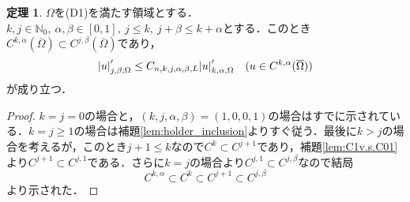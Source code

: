 \documentclass[a4paper]{ltjsarticle}
\newcommand{\Nset}{\mathbb{N}}
\newcommand{\Om}{\Omega}
\newcommand{\Ombar}{\overline{\Omega}}
\newcommand{\1}{\mathbbm{1}}
\numberwithin{equation}{section}
\theoremstyle{definition}
\newtheorem{thm}{定理}[section]
\begin{document}
\begin{thm}
    $\Om$を(D1)を満たす領域とする．$k,j\in\Nset_0,\ \alpha,\beta\in[0,1],\ j\leq k,\ j+\beta\leq k+\alpha$とする．このとき$C^{k,\alpha}(\Ombar)\subset C^{j,\beta}(\Ombar)$であり，
    \begin{equation}
        \abs{u}_{j,\beta;\Om}'\leq C_{n,k,j,\alpha,\beta,L}\abs{u}_{k,\alpha,\Om}'\quad (u\in C^{k,\alpha}(\Ombar))
    \end{equation}
    が成り立つ．
\end{thm}
\begin{proof}
    $k=j=0$の場合と，$(k,j,\alpha,\beta)=(1,0,0,1)$の場合はすでに示されている．$k=j\geq 1$の場合は補題\ref{lem:holder_inclusion}よりすぐ従う．最後に$k>j$の場合を考えるが，このとき$j+1\leq k$なので$C^k\subset C^{j+1}$であり，補題\ref{lem:C1v.s.C01}より$C^{j+1}\subset C^{j,1}$である．さらに$k=j$の場合より$C^{j,1}\subset C^{j,\beta}$なので結局
    \begin{equation}
        C^{k,\alpha}\subset C^{k}\subset C^{j+1} \subset C^{j,\beta}
    \end{equation}
    より示された．
\end{proof}
\end{document}
